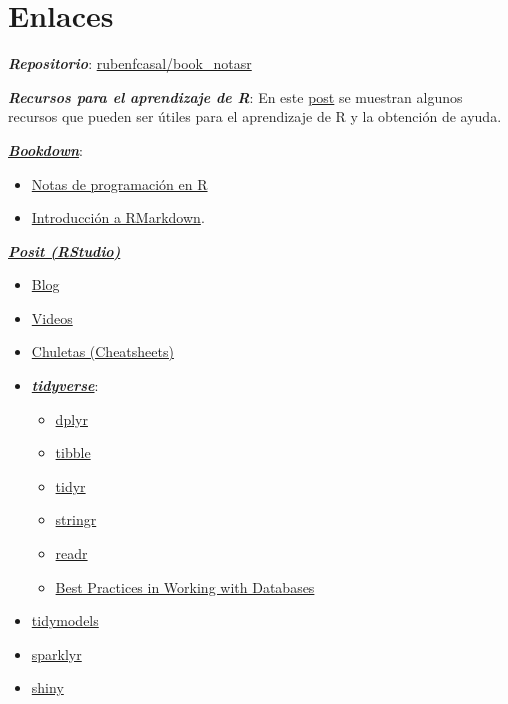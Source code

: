 \documentclass[
]{book}
\theoremstyle{break}
\theoremstyle{nonumberplain}
\begin{document}
\hypertarget{links}{%
\section*{Enlaces}\label{links}}

\textbf{\emph{Repositorio}}: \href{https://github.com/rubenfcasal/book_notasr}{rubenfcasal/book\_notasr}

\textbf{\emph{Recursos para el aprendizaje de R}}: En este \href{https://rubenfcasal.github.io/post/ayuda-y-recursos-para-el-aprendizaje-de-r}{post} se muestran algunos recursos que pueden ser útiles para el aprendizaje de R y la obtención de ayuda.

\href{https://bookdown.org}{\textbf{\emph{Bookdown}}}:

\begin{itemize}
\item
  \href{https://rubenfcasal.github.io/book_notasr/}{Notas de programación en R}
\item
  \href{https://rubenfcasal.github.io/bookdown_intro/rmarkdown.html}{Introducción a RMarkdown}.
\end{itemize}

\href{https://posit.co}{\textbf{\emph{Posit (RStudio)}}}

\begin{itemize}
\item
  \href{https://posit.co/blog}{Blog}
\item
  \href{https://posit.co/resources/videos}{Videos}
\item
  \href{https://posit.co/resources/cheatsheets}{Chuletas (Cheatsheets)}
\item
  \href{https://www.tidyverse.org/}{\textbf{\emph{tidyverse}}}:

  \begin{itemize}
  \item
    \href{https://dplyr.tidyverse.org}{dplyr}
  \item
    \href{https://tibble.tidyverse.org}{tibble}
  \item
    \href{https://tidyr.tidyverse.org}{tidyr}
  \item
    \href{https://stringr.tidyverse.org}{stringr}
  \item
    \href{https://readr.tidyverse.org}{readr}
  \item
    \href{https://solutions.posit.co/connections/db}{Best Practices in Working with Databases}
  \end{itemize}
\item
  \href{https://www.tidymodels.org}{tidymodels}
\item
  \href{https://spark.rstudio.com/}{sparklyr}
\item
  \href{http://shiny.rstudio.com}{shiny}
\end{itemize}

  
\end{document}
